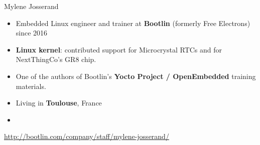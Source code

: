 \begin{frame}{Mylene Josserand}
    \begin{itemize}
	\item Embedded Linux engineer and trainer at {\bf Bootlin}
              (formerly Free Electrons) since 2016
	\item {\bf Linux kernel}: contributed support for Microcrystal RTCs
	      and for NextThingCo's GR8 chip.
	\item One of the authors of Bootlin's {\bf Yocto Project / OpenEmbedded}
	      training materials.
	\item Living in {\bf Toulouse}, France
	\item {}
    \end{itemize}
    {\small \url{http://bootlin.com/company/staff/mylene-josserand/}}
\end{frame}
